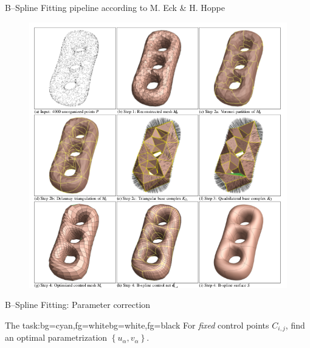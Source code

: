 \begin{frame}{B--Spline Fitting pipeline according to M. Eck \& H. Hoppe}
\begin{figure}
\includegraphics[width=0.625\linewidth]{Pictures/HoppePipeline.png}
\end{figure}
\end{frame}

\begin{frame}{B--Spline Fitting: Parameter correction}
\begin{variableblock}{The task:}{bg=cyan,fg=white}{bg=white,fg=black}
{
For \textit{fixed} control points $C_{i,j}$, find an optimal parametrization $\left\lbrace u_\alpha,v_\alpha \right\rbrace$.
}
\end{variableblock}

\end{frame}

